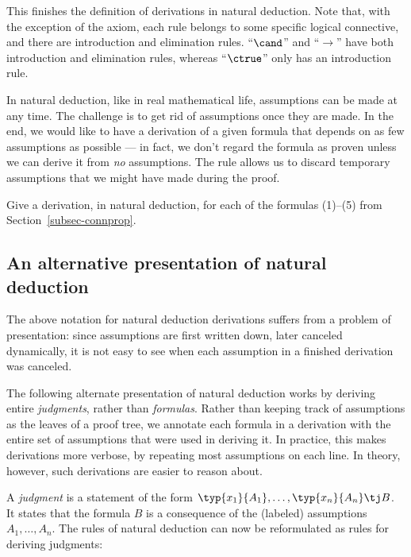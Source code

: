 \documentclass[12pt]{article}
\begin{document}
This finishes the definition of derivations in natural deduction. Note
that, with the exception of the axiom, each rule belongs to some
specific logical connective, and there are introduction and
elimination rules. ``$\cand$'' and ``$\to$'' have both introduction
and elimination rules, whereas ``$\ctrue$'' only has an introduction
rule.

In natural deduction, like in real mathematical life, assumptions can
be made at any time. The challenge is to get rid of assumptions once
they are made. In the end, we would like to have a derivation of a
given formula that depends on as few assumptions as possible --- in
fact, we don't regard the formula as proven unless we can derive it
from {\em no} assumptions. The rule {} allows us to
discard temporary assumptions that we might have made during the
proof.

\begin{exercise}
  Give a derivation, in natural deduction, for each of the formulas
  (1)--(5) from Section~\ref{subsec-connprop}.
\end{exercise}

\subsection{An alternative presentation of natural deduction}

The above notation for natural deduction derivations suffers from a
problem of presentation: since assumptions are first written down,
later canceled dynamically, it is not easy to see when each assumption
in a finished derivation was canceled. 

The following alternate presentation of natural deduction works by
deriving entire {\em judgments}, rather than {\em formulas}. Rather
than keeping track of assumptions as the leaves of a proof tree, we
annotate each formula in a derivation with the entire set of
assumptions that were used in deriving it. In practice, this makes
derivations more verbose, by repeating most assumptions on each line.
In theory, however, such derivations are easier to reason about.

A {\em judgment} is a statement of the form
$\typ{x_1}{A_1},\ldots,\typ{x_n}{A_n} \tj B$. It states that the
formula $B$ is a consequence of the (labeled) assumptions
$A_1,\ldots,A_n$. The rules of natural deduction can now be
reformulated as rules for deriving judgments:
\end{document}
